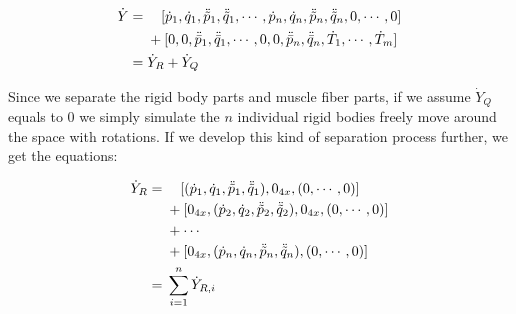 \documentclass[a4paper,10pt]{article}
\begin{document}
\begin{align}
\dot{Y} = {} & \quad[ \dot{p}_1, \dot{q}_1, \ddot{\tilde{p}}_1, \ddot{\tilde{q}}_1, \cdots ,
                \dot{p}_n, \dot{q}_n, \ddot{\tilde{p}}_n, \ddot{\tilde{q}}_n,
                0, \cdots, 0]\notag\\
             & + [ 0, 0, \ddot{\bar{p}}_1, \ddot{\bar{q}}_1, \cdots ,
                0, 0, \ddot{\bar{p}}_n, \ddot{\bar{q}}_n,
                \dot{T}_1, \cdots, \dot{T}_m]\notag\\
        = {} & \dot{Y}_R + \dot{Y}_Q\label{SeparatedYdot}
\end{align}

Since we separate the rigid body parts and muscle fiber parts, if we
assume $\dot{Y}_Q$ equals to 0 we simply simulate the $n$ individual
rigid bodies freely move around the space with rotations. If we develop
this kind of separation process further, we get the equations:

\begin{align}
\dot{Y}_R = {} &  \quad[ (\dot{p}_1, \dot{q}_1, \ddot{\tilde{p}}_1, \ddot{\tilde{q}}_1), 0_{4x}, (0, \cdots , 0)]\notag\\
               & +[ 0_{4x}, (\dot{p}_2, \dot{q}_2, \ddot{\tilde{p}}_2, \ddot{\tilde{q}}_2), 0_{4x}, (0, \cdots , 0)]\notag\\
               & + \cdots\notag\\
               & + [ 0_{4x}, (\dot{p}_n, \dot{q}_n, \ddot{\tilde{p}}_n, \ddot{\tilde{q}}_n), (0, \cdots , 0)]\notag\\
          = {} & \sum_{i=1}^{n}{\dot{Y}_{R,i}}
\end{align}
\end{document}
